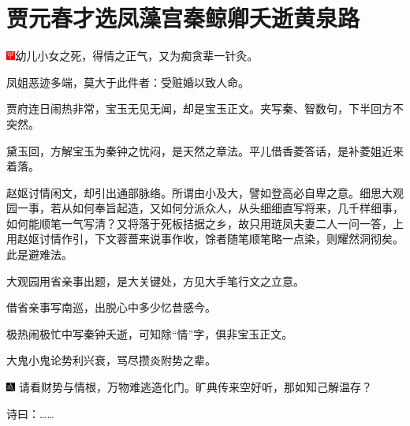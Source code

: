 

\chapter{贾元春才选凤藻宫\hspace{.5em}秦鲸卿夭逝黄泉路}

{\includegraphics[width=3mm]{../Images/00002}\kaishu 幼儿小女之死，得情之正气，又为痴贪辈一针灸。}

{\kaishu 凤姐恶迹多端，莫大于此件者：受赃婚以致人命。}

{\kaishu 贾府连日闹热非常，宝玉无见无闻，却是宝玉正文。夹写秦、智数句，下半回方不突然。}

{\kaishu 黛玉回，方解宝玉为秦钟之忧闷，是天然之章法。平儿借香菱答话，是补菱姐近来着落。}

{\kaishu 赵妪讨情闲文，却引出通部脉络。所谓由小及大，譬如登高必自卑之意。细思大观园一事，若从如何奉旨起造，又如何分派众人，从头细细直写将来，几千样细事，如何能顺笔一气写清？又将落于死板拮据之乡，故只用琏凤夫妻二人一问一答，上用赵妪讨情作引，下文蓉蔷来说事作收，馀者随笔顺笔略一点染，则耀然洞彻矣。此是避难法。}

{\kaishu 大观园用省亲事出题，是大关键处，方见大手笔行文之立意。}

{\kaishu 借省亲事写南巡，出脱心中多少忆昔感今。}

{\kaishu 极热闹极忙中写秦钟夭逝，可知除``情''字，俱非宝玉正文。}

{\kaishu 大鬼小鬼论势利兴衰，骂尽攒炎附势之辈。}

{\includegraphics[width=3mm]{../Images/00005}  \kaishu 请看财势与情根，万物难逃造化门。旷典传来空好听，那如知己解温存？}

诗曰：\ldots{}\ldots{}

